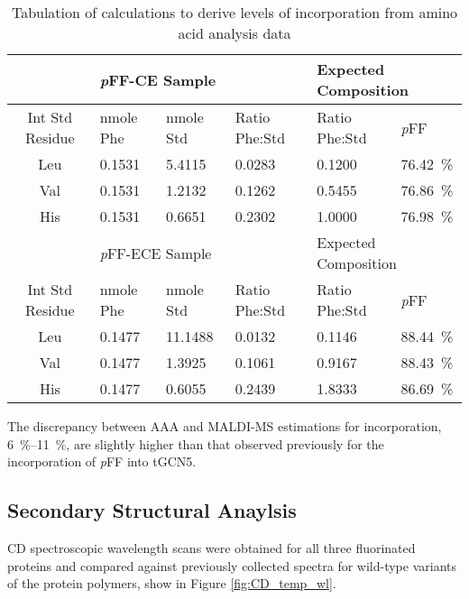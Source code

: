 \begin{refsection}
\begin{table}[h!]
\begin{tabular}{ clllll }
  \hline
  &
  \multicolumn{3}{l}{\emph{p}FF-CE Sample} &
  \multicolumn{2}{l}{Expected Composition} \\
  \hline
  Int Std Residue & nmole Phe & nmole Std & Ratio Phe:Std & Ratio Phe:Std& \emph{p}FF \\
  Leu & 0.1531 & 5.4115 & 0.0283 & 0.1200 & \SI{76.42}{\percent} \\
  Val & 0.1531 & 1.2132 & 0.1262 & 0.5455 & \SI{76.86}{\percent} \\
  His & 0.1531 & 0.6651 & 0.2302 & 1.0000 & \SI{76.98}{\percent} \\
  \hline
  &
  \multicolumn{3}{l}{\emph{p}FF-ECE Sample} &
  \multicolumn{2}{l}{Expected Composition} \\
  \hline
  Int Std Residue & nmole Phe & nmole Std & Ratio Phe:Std & Ratio Phe:Std& \emph{p}FF \\
  Leu & 0.1477 & 11.1488 & 0.0132 & 0.1146 & \SI{88.44}{\percent} \\
  Val & 0.1477 & 1.3925 & 0.1061 & 0.9167 & \SI{88.43}{\percent} \\
  His & 0.1477 & 0.6055 & 0.2439 & 1.8333 & \SI{86.69}{\percent} \\
  \hline
\end{tabular}
\caption{Tabulation of calculations to derive levels of incorporation from amino
acid analysis data}
\label{tab:aaa_analysis}
\end{table}
The discrepancy between AAA and MALDI-MS estimations for incorporation,
\SIrange[range-phrase=--]{6}{11}{\percent}, are slightly higher than that
observed previously for the incorporation of \emph{p}FF into tGCN5.\cite{Voloshchuk2009}

\subsection{Secondary Structural Anaylsis}
CD spectroscopic wavelength scans were obtained for all three fluorinated
proteins and compared against previously collected spectra for wild-type
variants of the protein polymers, show in Figure
\ref{fig:CD_temp_wl}.\cite{Haghpanah2009} 


\end{refsection}
